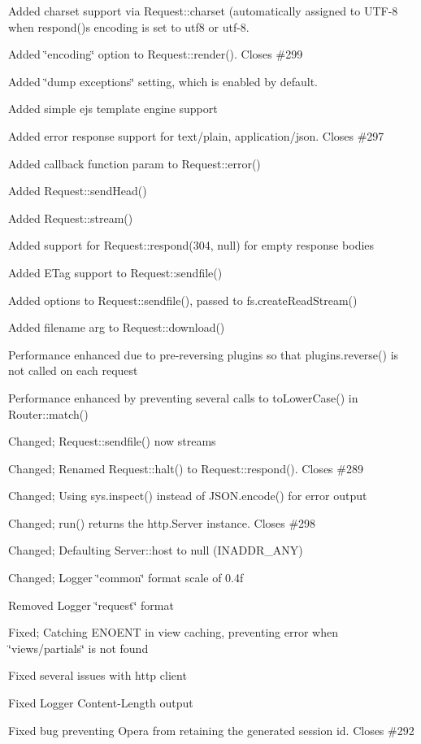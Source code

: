\begin{DoxyItemize}
\item Added charset support via Request\+::charset (automatically assigned to \textquotesingle{}U\+T\+F-\/8\textquotesingle{} when respond()\textquotesingle{}s encoding is set to \textquotesingle{}utf8\textquotesingle{} or \textquotesingle{}utf-\/8\textquotesingle{}.
\item Added \char`\"{}encoding\char`\"{} option to Request\+::render(). Closes \#299
\item Added \char`\"{}dump exceptions\char`\"{} setting, which is enabled by default.
\item Added simple ejs template engine support
\item Added error response support for text/plain, application/json. Closes \#297
\item Added callback function param to Request\+::error()
\item Added Request\+::send\+Head()
\item Added Request\+::stream()
\item Added support for Request\+::respond(304, null) for empty response bodies
\item Added E\+Tag support to Request\+::sendfile()
\item Added options to Request\+::sendfile(), passed to fs.\+create\+Read\+Stream()
\item Added filename arg to Request\+::download()
\item Performance enhanced due to pre-\/reversing plugins so that plugins.\+reverse() is not called on each request
\item Performance enhanced by preventing several calls to to\+Lower\+Case() in Router\+::match()
\item Changed; Request\+::sendfile() now streams
\item Changed; Renamed Request\+::halt() to Request\+::respond(). Closes \#289
\item Changed; Using sys.\+inspect() instead of J\+S\+O\+N.\+encode() for error output
\item Changed; run() returns the http.\+Server instance. Closes \#298
\item Changed; Defaulting Server\+::host to null (I\+N\+A\+D\+D\+R\+\_\+\+A\+N\+Y)
\item Changed; Logger \char`\"{}common\char`\"{} format scale of 0.\+4f
\item Removed Logger \char`\"{}request\char`\"{} format
\item Fixed; Catching E\+N\+O\+E\+N\+T in view caching, preventing error when \char`\"{}views/partials\char`\"{} is not found
\item Fixed several issues with http client
\item Fixed Logger Content-\/\+Length output
\item Fixed bug preventing Opera from retaining the generated session id. Closes \#292
\end{DoxyItemize}


